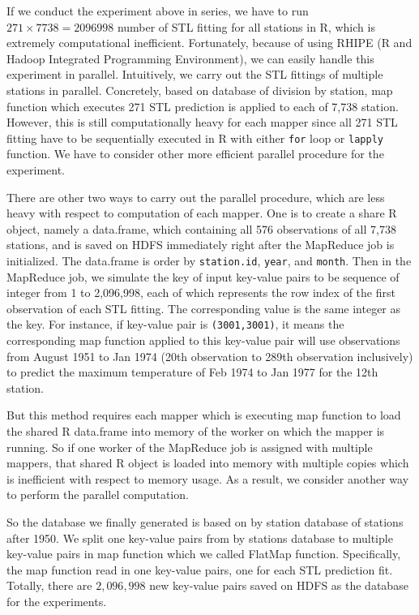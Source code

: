 If we conduct the experiment above in series, we have to run 
$271 \times 7738 = 2096998$ number of STL fitting for all stations in R, which is 
extremely computational inefficient. Fortunately, because of using RHIPE
(R and Hadoop Integrated Programming Environment), we can easily handle this 
experiment in parallel. Intuitively, we carry out the STL fittings of multiple 
stations in parallel. Concretely, based on database of division by station, map
function which executes 271 STL prediction is applied to each of 7,738 station.
However, this is still computationally heavy for each mapper since all 271 STL 
fitting have to be sequentially executed in R with either \texttt{for} loop or 
\texttt{lapply} function. We have to consider other more efficient parallel 
procedure for the experiment.

There are other two ways to carry out the parallel procedure, which are less 
heavy with respect to computation of each mapper. One is to create a share
R object, namely a data.frame, which containing all 576 observations of all 7,738 
stations, and is saved on HDFS immediately right after the MapReduce job is 
initialized. The data.frame is order by \texttt{station.id}, \texttt{year}, and
\texttt{month}. Then in the MapReduce job, we simulate the key of input key-value
pairs to be sequence of integer from 1 to 2,096,998, each of which represents the
row index of the first observation of each STL fitting. The corresponding value 
is the same integer as the key. For instance, if key-value pair is 
\texttt{(3001,3001)}, it means the corresponding map function applied to this 
key-value pair will use observations from August 1951 to Jan 1974 (20th observation
to 289th observation inclusively) to predict the maximum temperature of Feb 1974
to Jan 1977 for the 12th station.

But this method requires each mapper which is executing map function to load the
shared R data.frame into memory of the worker on which the mapper is running. So
if one worker of the MapReduce job is assigned with multiple mappers, that shared
R object is loaded into memory with multiple copies which is inefficient with
respect to memory usage. As a result, we consider another way to perform the 
parallel computation. 

So the database we finally generated is based on 
by station database of stations after 1950. We split one key-value pairs from by 
stations database to multiple key-value pairs in map function which we called 
FlatMap function. Specifically, the map function read in one key-value pairs, one
for each STL prediction fit. Totally, there are $2,096,998$ new key-value pairs 
saved on HDFS as the database for the experiments.

